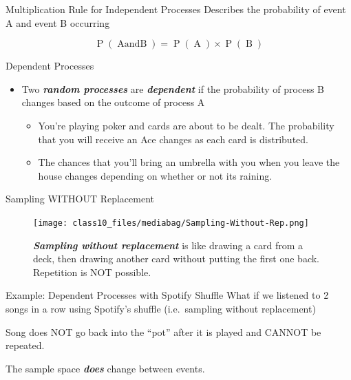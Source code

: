 \documentclass[
  ignorenonframetext,
]{beamer}
\begin{document}
\begin{frame}{Multiplication Rule for Independent Processes}
\label{multiplication-rule-for-independent-processes}
Describes the probability of event A and event B occurring

\[
\operatorname{P}(\operatorname{A and B})=\operatorname{P}(\operatorname{A}) \times \operatorname{P}(\operatorname{B})
\]
\end{frame}

\begin{frame}{Dependent Processes}
\label{dependent-processes}
\begin{itemize}
\item
  Two \textbf{\emph{random processes}} are \textbf{\emph{dependent}} if
  the probability of process B changes based on the outcome of process A

  \begin{itemize}
  \item
    You're playing poker and cards are about to be dealt. The
    probability that you will receive an Ace changes as each card is
    distributed.
  \item
    The chances that you'll bring an umbrella with you when you leave
    the house changes depending on whether or not its raining.
  \end{itemize}
\end{itemize}
\end{frame}

\begin{frame}{Sampling WITHOUT Replacement}
\label{sampling-without-replacement}
\begin{figure}[H]

{\centering \texttt{[image: class10\_files/mediabag/Sampling-Without-Rep.png]}

}

\caption{\textbf{\emph{Sampling without replacement}} is like drawing a
card from a deck, then drawing another card without putting the first
one back. Repetition is NOT possible.}

\end{figure}%
\end{frame}

\begin{frame}{Example: Dependent Processes with Spotify Shuffle}
\label{example-dependent-processes-with-spotify-shuffle}
What if we listened to 2 songs in a row using Spotify's shuffle
(i.e.~sampling without replacement)

Song does NOT go back into the ``pot'' after it is played and CANNOT be
repeated.

The sample space \textbf{\emph{does}} change between events.
\end{frame}
\end{document}
